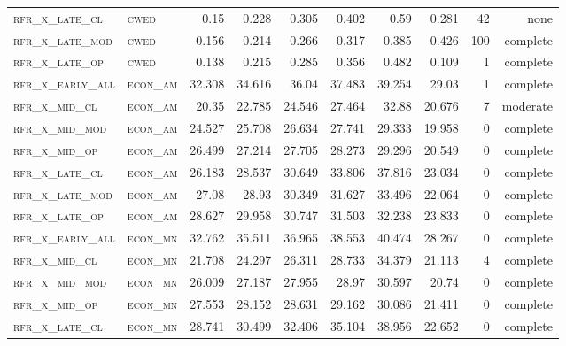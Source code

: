 \begin{landscape}
\begin{center}
\begin{footnotesize}
\begin{longtable}{llrrrrr|rrr}
\textsc{rfr\_x\_late\_cl  } & \textsc{cwed      }   & 0.15    & 0.228   & 0.305    & 0.402    & 0.59     & 0.281   & 42  & none     \\
\textsc{rfr\_x\_late\_mod } & \textsc{cwed      }   & 0.156   & 0.214   & 0.266    & 0.317    & 0.385    & 0.426   & 100 & complete \\
\textsc{rfr\_x\_late\_op  } & \textsc{cwed      }   & 0.138   & 0.215   & 0.285    & 0.356    & 0.482    & 0.109   & 1   & complete \\
\textsc{rfr\_x\_early\_all} & \textsc{econ\_am  }   & 32.308  & 34.616  & 36.04    & 37.483   & 39.254   & 29.03   & 1   & complete \\
\textsc{rfr\_x\_mid\_cl   } & \textsc{econ\_am  }   & 20.35   & 22.785  & 24.546   & 27.464   & 32.88    & 20.676  & 7   & moderate \\
\textsc{rfr\_x\_mid\_mod  } & \textsc{econ\_am  }   & 24.527  & 25.708  & 26.634   & 27.741   & 29.333   & 19.958  & 0   & complete \\
\textsc{rfr\_x\_mid\_op   } & \textsc{econ\_am  }   & 26.499  & 27.214  & 27.705   & 28.273   & 29.296   & 20.549  & 0   & complete \\
\textsc{rfr\_x\_late\_cl  } & \textsc{econ\_am  }   & 26.183  & 28.537  & 30.649   & 33.806   & 37.816   & 23.034  & 0   & complete \\
\textsc{rfr\_x\_late\_mod } & \textsc{econ\_am  }   & 27.08   & 28.93   & 30.349   & 31.627   & 33.496   & 22.064  & 0   & complete \\
\textsc{rfr\_x\_late\_op  } & \textsc{econ\_am  }   & 28.627  & 29.958  & 30.747   & 31.503   & 32.238   & 23.833  & 0   & complete \\
\textsc{rfr\_x\_early\_all} & \textsc{econ\_mn  }   & 32.762  & 35.511  & 36.965   & 38.553   & 40.474   & 28.267  & 0   & complete \\
\textsc{rfr\_x\_mid\_cl   } & \textsc{econ\_mn  }   & 21.708  & 24.297  & 26.311   & 28.733   & 34.379   & 21.113  & 4   & complete \\
\textsc{rfr\_x\_mid\_mod  } & \textsc{econ\_mn  }   & 26.009  & 27.187  & 27.955   & 28.97    & 30.597   & 20.74   & 0   & complete \\
\textsc{rfr\_x\_mid\_op   } & \textsc{econ\_mn  }   & 27.553  & 28.152  & 28.631   & 29.162   & 30.086   & 21.411  & 0   & complete \\
\textsc{rfr\_x\_late\_cl  } & \textsc{econ\_mn  }   & 28.741  & 30.499  & 32.406   & 35.104   & 38.956   & 22.652  & 0   & complete \\

\end{longtable}
\end{footnotesize}
\end{center}
\end{landscape}
